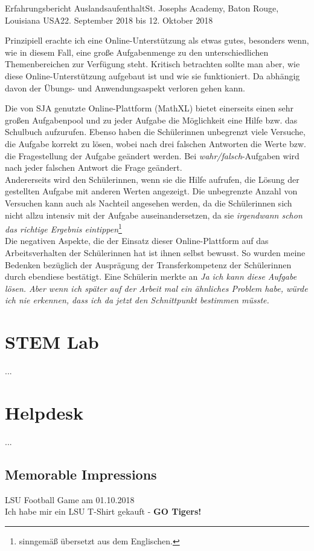 \documentclass[oneside,openany,headings=optiontotoc,11pt,numbers=noenddot]{article}
\begin{document}
\begin{worksheet}{Erfahrungsbericht Auslandsaufenthalt}{St. Joseph\grq{}s Academy, Baton Rouge, Louisiana USA}{22. September 2018 bis 12. Oktober 2018}
		\begin{adjustwidth}{0.25cm}{}
			\small{Prinzipiell erachte ich eine Online-Unterstützung als etwas gutes, besonders wenn, wie in diesem Fall, eine große Aufgabenmenge zu den unterschiedlichen Themenbereichen zur Verfügung steht. Kritisch betrachten sollte man aber, wie diese Online-Unterstützung aufgebaut ist und wie sie funktioniert. Da abhängig davon der Übungs- und Anwendungsaspekt verloren gehen kann.}\normalsize\\
		\end{adjustwidth}
		\par\noindent
		Die von SJA genutzte Online-Plattform (MathXL) bietet einerseits einen sehr großen Aufgabenpool und zu jeder Aufgabe die Möglichkeit eine Hilfe bzw. das Schulbuch aufzurufen. Ebenso haben die Schülerinnen unbegrenzt viele Versuche, die Aufgabe korrekt zu lösen, wobei nach drei falschen Antworten die Werte bzw. die Fragestellung der Aufgabe geändert werden. Bei \textit{wahr/falsch}-Aufgaben wird nach jeder falschen Antwort die Frage geändert.\\
		Andererseits  wird den Schülerinnen, wenn sie die Hilfe aufrufen, die Lösung der gestellten Aufgabe mit anderen Werten angezeigt. Die unbegrenzte Anzahl von Versuchen kann auch als Nachteil angesehen werden, da die Schülerinnen sich nicht allzu intensiv mit der Aufgabe auseinandersetzen, da sie \glqq{}\textit{irgendwann schon das richtige Ergebnis eintippen}\grqq{}\footnote{\label{fn:trans}sinngemäß übersetzt aus dem Englischen.}\\
		Die negativen Aspekte, die der Einsatz dieser Online-Plattform auf das Arbeitsverhalten der Schülerinnen hat ist ihnen selbst bewusst. So wurden meine Bedenken bezüglich der Ausprägung der Transferkompetenz der Schülerinnen durch ebendiese bestätigt. Eine Schülerin merkte an \glqq{}\textit{Ja ich kann diese Aufgabe lösen. Aber wenn ich später auf der Arbeit mal ein ähnliches Problem habe, würde ich nie erkennen, dass ich da jetzt den Schnittpunkt bestimmen müsste.}\grqq{}
		\section{STEM Lab}
		...
		\section{Helpdesk}
		...		
		\subsection{Memorable Impressions}
		LSU Football Game am 01.10.2018\\
		Ich habe mir ein LSU T-Shirt gekauft - \textbf{GO Tigers!}
	\end{worksheet}
\end{document}
